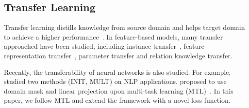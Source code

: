 \subsection{Transfer Learning}

Transfer learning distills knowledge from source domain and helps target domain to achieve a higher performance~\cite{Pan:2010:STL:1850483.1850545}. In feature-based models, many transfer approached have been studied, including instance transfer~\cite{DBLP:conf/acl/JiangZ07,DBLP:conf/icml/LiaoXC05}, feature representation transfer~\cite{DBLP:conf/nips/ArgyriouEP06,DBLP:conf/nips/ArgyriouMPY07}, parameter transfer\cite{DBLP:conf/icml/LawrenceP04,DBLP:conf/nips/BonillaCW07} and relation knowledge transfer\cite{DBLP:conf/aaai/MihalkovaHM07,Mihalkova09transferlearning}. 

Recently, the transferability of neural networks is also studied. For example, ~\cite{DBLP:journals/corr/MouMYLXZJ16} studied two methods (INIT, MULT) on NLP applications.  proposed to use domain mask and linear projection upon multi-task learning (MTL)~\cite{DBLP:journals/corr/Long015a}. In this paper, we follow MTL and extend the framework with a novel loss function.

